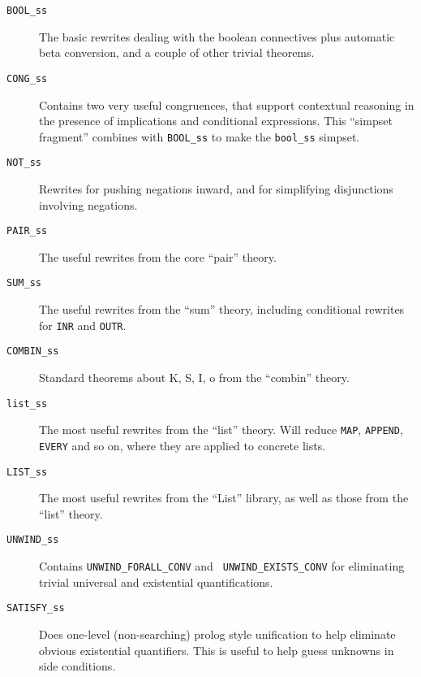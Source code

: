 \documentclass[a4]{article}
\begin{document}
\begin{description}
\item[{\tt BOOL\_ss}] The basic rewrites dealing with the boolean connectives
  plus automatic beta conversion, and a couple of other trivial
  theorems.

\item[{\tt CONG\_ss}] Contains two very useful congruences, that
  support contextual reasoning in the presence of implications and
  conditional expressions.  This ``simpset fragment'' combines with
  {\tt BOOL\_ss} to make the {\tt bool\_ss} simpset.

\item[{\tt NOT\_ss}] Rewrites for pushing negations inward, and for
  simplifying disjunctions involving negations.

\item[{\tt PAIR\_ss}] The useful rewrites from the core ``pair''
  theory.

\item[{\tt SUM\_ss}] The useful rewrites from the ``sum'' theory,
  including conditional rewrites for {\tt INR} and {\tt OUTR}.

\item[{\tt COMBIN\_ss}] Standard theorems about K, S, I, o from the
  ``combin'' theory.

\item[{\tt list\_ss}] The most useful rewrites from the ``list''
  theory.  Will reduce {\tt MAP}, {\tt APPEND}, {\tt EVERY} and so
  on, where they are applied to concrete lists.

\item[{\tt LIST\_ss}] The most useful rewrites from the ``List''
  library, as well as those from the ``list'' theory.

\item[{\tt UNWIND\_ss}] Contains {\tt UNWIND\_FORALL\_CONV} and {\tt
    UNWIND\_EXISTS\_CONV} for eliminating trivial universal and
  existential quantifications.

\item[{\tt SATISFY\_ss}] Does one-level (non-searching) prolog style
  unification to help eliminate obvious existential quantifiers.  This
  is useful to help guess unknowns in side conditions.


\end{description}
\end{document}
